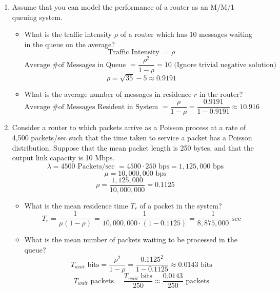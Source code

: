\documentclass[12pt]{article}
\begin{document}
\begin{enumerate}
\newpage

\item Assume that you can model the performance of a router as an M/M/1 queuing system. 
  \begin{itemize}
   \item What is the traffic intensity $\rho$ of a router which has 10 messages waiting in the queue on the average? 
     \[ \textrm{Traffic Intensity } = \rho \]
     \[ \textrm{Average \# of Messages in Queue } = \frac{\rho^2}{1-\rho} = 10 \textrm{ (Ignore trivial negative solution)} \]
     \[ \rho = \sqrt{35} - 5 \approx 0.9191\]
   \item What is the average number of messages in residence $r$ in the router? 
     \[ \textrm{Average \# of Messages Resident in System } = \frac{\rho}{1-\rho} = \frac{0.9191}{1-0.9191} \approx 10.916 \] 
   \end{itemize}

\newpage

\item Consider a router to which packets arrive as a Poisson process at a rate of 4,500 packets/sec such that the time taken to service a packet has a Poisson distribution.  Suppose that the mean packet length is 250 bytes, and that the output link capacity is 10 Mbps. 
  \[ \lambda = 4500 \textrm{ Packets/sec } = 4500 \cdot 250 \textrm{ bps} = 1,125,000 \textrm{ bps} \]
  \[ \mu = 10,000,000 \textrm{ bps} \]
  \[ \rho = \frac{1,125,000}{10,000,000} = 0.1125 \]
  \begin{itemize}
  \item What is the mean residence time $T_r$ of a packet in the system? 
    \[ T_r = \frac{1}{\mu (1-\rho)} = \frac{1}{10,000,000 \cdot (1-0.1125)} = \frac{1}{8,875,000} \textrm{ sec} \]
  \item What is the mean number of packets waiting to be processed in the queue?   
    \[ T_{wait} \textrm{ bits} = \frac{\rho^2}{1-\rho} = \frac{0.1125^2}{1-0.1125} \approx 0.0143 \textrm{ bits} \]
    \[ T_{wait} \textrm{ packets} = \frac{T_{wait} \textrm{ bits}}{250} \approx \frac{0.0143}{250} \textrm{ packets} \]
  \end{itemize}

\newpage


\end{enumerate}
\end{document}

